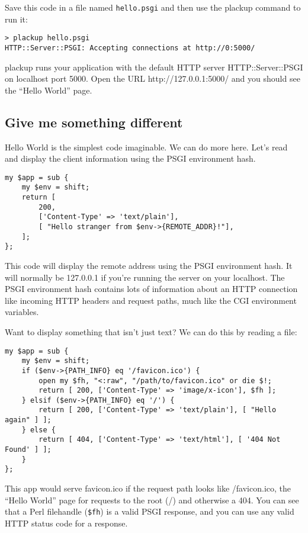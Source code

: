 Save this code in a file named \lstinline!hello.psgi! and then use the
plackup command to run it:

\begin{lstlisting}
> plackup hello.psgi
HTTP::Server::PSGI: Accepting connections at http://0:5000/
\end{lstlisting}

plackup runs your application with the default HTTP server
HTTP::Server::PSGI on localhost port 5000. Open the URL
http://127.0.0.1:5000/ and you should see the ``Hello World'' page.

\subsection{Give me something
different}\label{give-me-something-different}

Hello World is the simplest code imaginable. We can do more here. Let's
read and display the client information using the PSGI environment hash.

\begin{lstlisting}
my $app = sub {
    my $env = shift;
    return [
        200,
        ['Content-Type' => 'text/plain'],
        [ "Hello stranger from $env->{REMOTE_ADDR}!"],
    ];
};
\end{lstlisting}

This code will display the remote address using the PSGI environment
hash. It will normally be 127.0.0.1 if you're running the server on your
localhost. The PSGI environment hash contains lots of information about
an HTTP connection like incoming HTTP headers and request paths, much
like the CGI environment variables.

Want to display something that isn't just text? We can do this by
reading a file:

\begin{lstlisting}
my $app = sub {
    my $env = shift;
    if ($env->{PATH_INFO} eq '/favicon.ico') {
        open my $fh, "<:raw", "/path/to/favicon.ico" or die $!;
        return [ 200, ['Content-Type' => 'image/x-icon'], $fh ];
    } elsif ($env->{PATH_INFO} eq '/') {
        return [ 200, ['Content-Type' => 'text/plain'], [ "Hello again" ] ];
    } else {
        return [ 404, ['Content-Type' => 'text/html'], [ '404 Not Found' ] ];
    }
};
\end{lstlisting}

This app would serve favicon.ico if the request path looks like
/favicon.ico, the ``Hello World'' page for requests to the root (/) and
otherwise a 404. You can see that a Perl filehandle (\lstinline!$fh!) is
a valid PSGI response, and you can use any valid HTTP status code for a
response.

